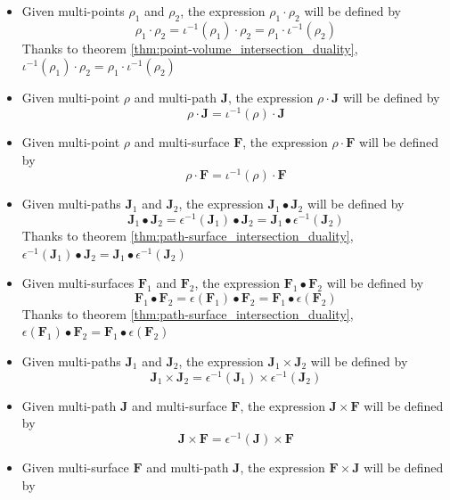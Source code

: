 \begin{itemize}
\item Given multi-points \(\rho_1\) and \(\rho_2\), the expression \(\rho_1 \cdot \rho_2\) will be defined by  
\[\rho_1 \cdot \rho_2 = \iota^{-1}(\rho_1) \cdot \rho_2 = \rho_1 \cdot \iota^{-1}(\rho_2)\]
Thanks to theorem \ref{thm:point-volume_intersection_duality}, \(\iota^{-1}(\rho_1) \cdot \rho_2 = \rho_1 \cdot \iota^{-1}(\rho_2)\)
\item Given multi-point \(\rho\) and multi-path \(\mathbf{J}\), the expression \(\rho \cdot \mathbf{J}\) will be defined by
\[\rho \cdot \mathbf{J} = \iota^{-1}(\rho) \cdot \mathbf{J}\]
\item Given multi-point \(\rho\) and multi-surface \(\mathbf{F}\), the expression \(\rho \cdot \mathbf{F}\) will be defined by
\[\rho \cdot \mathbf{F} = \iota^{-1}(\rho) \cdot \mathbf{F}\]
\item Given multi-paths \(\mathbf{J}_1\) and \(\mathbf{J}_2\), the expression \(\mathbf{J}_1 \bullet \mathbf{J}_2\) will be defined by 
\[\mathbf{J}_1 \bullet \mathbf{J}_2 = \epsilon^{-1}(\mathbf{J}_1) \bullet \mathbf{J}_2 = \mathbf{J}_1 \bullet \epsilon^{-1}(\mathbf{J}_2)\]
Thanks to theorem \ref{thm:path-surface_intersection_duality}, \(\epsilon^{-1}(\mathbf{J}_1) \bullet \mathbf{J}_2 = \mathbf{J}_1 \bullet \epsilon^{-1}(\mathbf{J}_2)\)
\item Given multi-surfaces \(\mathbf{F}_1\) and \(\mathbf{F}_2\), the expression \(\mathbf{F}_1 \bullet \mathbf{F}_2\) will be defined by 
\[\mathbf{F}_1 \bullet \mathbf{F}_2 = \epsilon(\mathbf{F}_1) \bullet \mathbf{F}_2 = \mathbf{F}_1 \bullet \epsilon(\mathbf{F}_2)\]
Thanks to theorem \ref{thm:path-surface_intersection_duality}, \(\epsilon(\mathbf{F}_1) \bullet \mathbf{F}_2 = \mathbf{F}_1 \bullet \epsilon(\mathbf{F}_2)\)
\item Given multi-paths \(\mathbf{J}_1\) and \(\mathbf{J}_2\), the expression \(\mathbf{J}_1 \times \mathbf{J}_2\) will be defined by 
\[\mathbf{J}_1 \times \mathbf{J}_2 = \epsilon^{-1}(\mathbf{J}_1) \times \epsilon^{-1}(\mathbf{J}_2)\]
\item Given multi-path \(\mathbf{J}\) and multi-surface \(\mathbf{F}\), the expression \(\mathbf{J} \times \mathbf{F}\) will be defined by 
\[\mathbf{J} \times \mathbf{F} = \epsilon^{-1}(\mathbf{J}) \times \mathbf{F}\]
\item Given multi-surface \(\mathbf{F}\) and multi-path \(\mathbf{J}\), the expression \(\mathbf{F} \times \mathbf{J}\) will be defined by 

\end{itemize}
